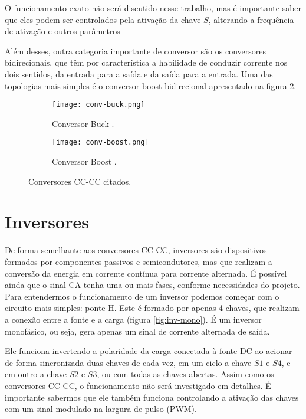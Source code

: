    O funcionamento exato não será discutido nesse trabalho, mas é importante saber que eles podem ser controlados pela ativação da chave $S$, alterando a frequência de ativação e outros parâmetros

   Além desses, outra categoria importante de conversor são os conversores bidirecionais, que têm por característica a habilidade de conduzir corrente nos dois sentidos, da entrada para a saída e da saída para a entrada. Uma das topologias mais simples é o conversor boost bidirecional apresentado na figura \ref{fig:conv-boost}.

   \begin{figure}[!htb]
   \centering
      \begin{subfigure}{0.48\linewidth}
         \centering
         \texttt{[image: conv-buck.png]}
         \caption{Conversor Buck \cite{Pet01}.}
         \label{fig:conv-buck}
      \end{subfigure}
      \hspace*{\fill}
      \begin{subfigure}{0.48\linewidth}
         \centering
         \texttt{[image: conv-boost.png]}
         \caption{Conversor Boost \cite{Pom17}.}
         \label{fig:conv-boost}
      \end{subfigure}
   \caption{Conversores CC-CC citados.}
   \label{fig:conv-esquematicos}
   \end{figure}


\section{Inversores}

   De forma semelhante aos conversores CC-CC, inversores são dispositivos formados por componentes passivos e semicondutores, mas que realizam a conversão da energia em corrente contínua para corrente alternada. É possível ainda que o sinal CA tenha uma ou mais fases, conforme necessidades do projeto. Para entendermos o funcionamento de um inversor podemos começar com o circuito mais simples: ponte H. Este é formado por apenas 4 chaves, que realizam a conexão entre a fonte e a carga (figura \ref{fig:inv-mono}). É um inversor monofásico, ou seja, gera apenas um sinal de corrente alternada de saída.

   Ele funciona invertendo a polaridade da carga conectada à fonte DC ao acionar de forma sincronizada duas chaves de cada vez, em um ciclo a chave $S1$ e $S4$, e em outro a chave $S2$ e $S3$, ou com todas as chaves abertas. Assim como os conversores CC-CC, o funcionamento não será investigado em detalhes. É importante sabermos que ele também funciona controlando a ativação das chaves com um sinal modulado na largura de pulso (PWM).

